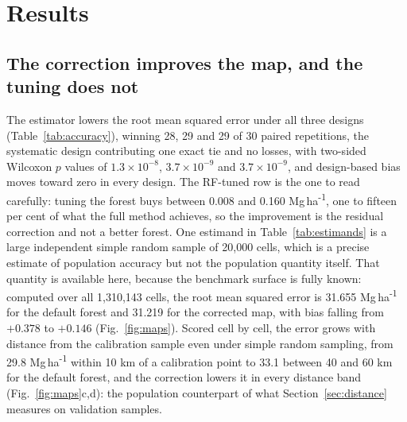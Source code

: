 \documentclass[preprint,12pt,authoryear]{elsarticle}
\newcommand{\Mgha}{Mg\,ha\textsuperscript{-1}}
\begin{document}
\section{Results}
\label{sec:results}

\subsection{The correction improves the map, and the tuning does not}

The estimator lowers the root mean squared error under all three designs
(Table~\ref{tab:accuracy}), winning 28, 29 and 29 of 30 paired repetitions, the
systematic design contributing one exact tie and no losses, with two-sided
Wilcoxon $p$ values of $1.3\times10^{-8}$, $3.7\times10^{-9}$ and
$3.7\times10^{-9}$, and design-based bias moves toward zero in every design. The
RF-tuned row is the one to read carefully: tuning the forest buys between 0.008
and 0.160 \Mgha{}, one to fifteen per cent of what the full method achieves, so
the improvement is the residual correction and not a better forest. One estimand in Table~\ref{tab:estimands} is a large independent simple random
sample of 20{,}000 cells, which is a precise estimate of population accuracy but
not the population quantity itself. That quantity is available here, because the
benchmark surface is fully known: computed over all 1{,}310{,}143 cells, the root mean squared error is 31.655 \Mgha{} for the default
forest and 31.219 for the corrected map, with bias falling from $+0.378$ to
$+0.146$ (Fig.~\ref{fig:maps}). Scored cell by cell, the error grows with
distance from the calibration sample even under simple random sampling, from
29.8 \Mgha{} within 10 km of a calibration point to 33.1 between 40 and 60 km
for the default forest, and the correction lowers it in every distance band
(Fig.~\ref{fig:maps}c,d): the population counterpart of what
Section~\ref{sec:distance} measures on validation samples.

\begin{table}[!ht]
\centering
\caption{Design-based accuracy by calibration design, 30 repetitions each,
$n=500$ for both calibration and validation. ME is the mean error and RMSE the
root mean squared error, both in \Mgha{}; SD is the standard deviation of the
RMSE across repetitions; MEC is the modelling efficiency coefficient of
\citet{nash1970}, one minus the ratio of the residual to the total sum of
squares. TARF is the method proposed here.}
\label{tab:accuracy}
\small

\end{table}
\end{document}
